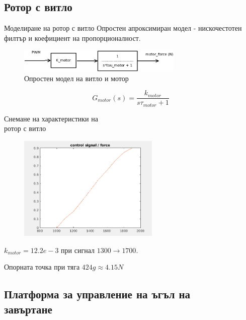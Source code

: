 \documentclass[handout]{beamer}
\begin{document}
\subsection{Ротор с витло}

\begin{frame}{Моделиране на ротор с витло}
	Опростен апроксимиран модел - нискочестотен филтър и коефициент на пропорционалност.
	\begin{figure}[htpb!]
		\centering
		\includegraphics[width=0.7\textwidth]{Images/motor_model.png}
		\caption{Опростен модел на витло и мотор}
		\label{fig:motor_model}
	\end{figure}

	\begin{equation*}
		G_{motor}(s) = \frac{k_{motor}}{s \tau_{motor} + 1}
		\label{eqn:motor_model}
	\end{equation*}

\end{frame}

\begin{frame}{Снемане на характеристики на \\ротор с витло}

\begin{figure}[htpb!]
    \centering
    \includegraphics[width=0.6\textwidth]{Images/control_force.png}
\end{figure}


\(k_{motor} = 12.2e-3\) при сигнал \(1300\to1700\).

Опорната точка при тяга \(424g \approx 4.15N\)

\end{frame}

\subsection{Платформа за управление на ъгъл на\\ завъртане}
\end{document}
